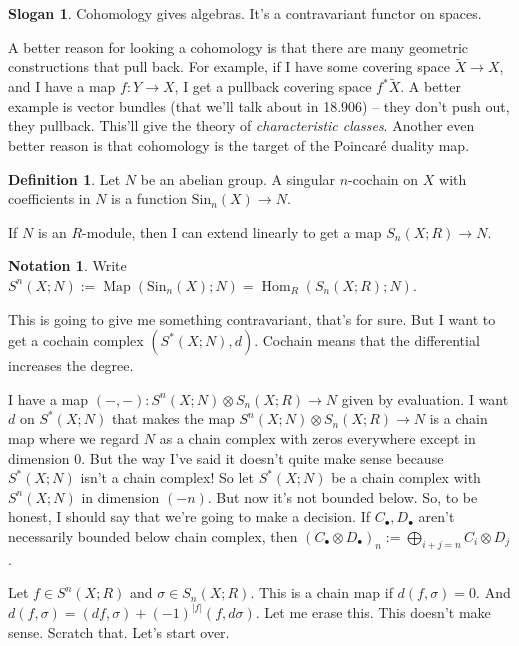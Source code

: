 \documentclass{amsart}
\theoremstyle{theorem}
\theoremstyle{definition}
\newtheorem{definition}[theorem]{Definition}
\newtheorem{notation}[theorem]{Notation}
\newtheorem{slogan}[theorem]{Slogan}
\DeclareMathOperator{\Hom}{Hom}
\DeclareMathOperator{\Map}{Map}
\newcommand{\Sin}{\mathrm{Sin}}
\begin{document}
\begin{slogan}
Cohomology gives algebras. It's a contravariant functor on spaces.
\end{slogan}
A better reason for looking a cohomology is that there are many geometric constructions that pull back. For example, if I have some covering space $\widetilde{X}\to X$, and I have a map $f:Y\to X$, I get a pullback covering space $f^{\ast}\widetilde{X}$. A better example is vector bundles (that we'll talk about in 18.906) -- they don't push out, they pullback. This'll give the theory of \emph{characteristic classes}. Another even better reason is that cohomology is the target of the Poincar\'{e} duality map.
\begin{definition}
Let $N$ be an abelian group. A singular $n$-cochain on $X$ with coefficients in $N$ is a function $\Sin_n(X)\to N$. 
\end{definition}
If $N$ is an $R$-module, then I can extend linearly to get a map $S_n(X;R)\to N$.
\begin{notation}
Write $S^n(X;N):=\Map(\Sin_n(X);N)=\Hom_R(S_n(X;R);N)$.
\end{notation}
This is going to give me something contravariant, that's for sure. But I want to get a cochain complex $(S^\ast(X;N),d)$. Cochain means that the differential increases the degree.

I have a map $(-,-):S^n(X;N)\otimes S_n(X;R)\to N$ given by evaluation. I want $d$ on $S^\ast(X;N)$ that makes the map $S^n(X;N)\otimes S_n(X;R)\to N$ is a chain map where we regard $N$ as a chain complex with zeros everywhere except in dimension $0$. But the way I've said it doesn't quite make sense because $S^\ast(X;N)$ isn't a chain complex! So let $S^\ast(X;N)$ be a chain complex with $S^n(X;N)$ in dimension $(-n)$. But now it's not bounded below. So, to be honest, I should say that we're going to make a decision. If $C_\bullet,D_\bullet$ aren't necessarily bounded below chain complex, then $(C_\bullet\otimes D_\bullet)_n:=\bigoplus_{i+j=n}C_i\otimes D_j$.

Let $f\in S^n(X;R)$ and $\sigma\in S_n(X;R)$. This is a chain map if $d (f,\sigma)=0$. And $d(f,\sigma)=(df,\sigma)+(-1)^{|f|}(f,d\sigma)$. Let me erase this. This doesn't make sense. Scratch that. Let's start over.
\end{document}
